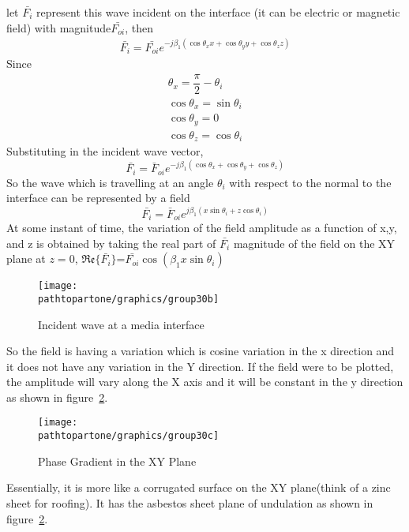 let $\bar{F_i}$ represent this wave incident on the interface (it can be electric or magnetic field) with magnitude$\bar{F_{oi}}$, then
\begin{align*}
\bar{F_{i}}=\bar{F_{oi}}e^{-j\beta_1(\cos\theta_xx +\cos\theta_yy+\cos\theta_zz)}
\end{align*}
\begin{equation}\end{equation}
Since
\begin{align*}
\theta_x=\dfrac{\pi}{2}-\theta_i\\
\cos\theta _x=\sin \theta_i\\
\cos \theta_y=0\\
\cos\theta_z=\cos \theta_i
\end{align*}
\begin{equation}\end{equation}
Substituting in the incident wave vector,
$$\bar{F_i}=\bar{F}_{oi}e^{-j\beta_1(\cos \theta_x+\cos \theta_y+\cos \theta_z)}$$
\begin{equation}\end{equation}
So the wave  which is travelling at an angle $\theta_i$ with respect to the normal to the interface can be represented by a field
$$\bar{F_i}=\bar{F}_{oi}e^{j\beta_1(x\sin \theta_i+z\cos \theta_i)} $$
\begin{equation}\end{equation}
At some instant of time, the variation of the field amplitude as a function of x,y, and z is obtained by taking the real part of $\bar{F_i}$ magnitude of the field on the XY plane at $z=0$, $\mathfrak{Re}\{\bar{F_i}\}$=$\bar{F_{oi}}\cos (\beta_1x\sin \theta_i)$
\begin{figure}[h]
\centering
\texttt{[image: \\pathtopartone/graphics/group30b]}
\caption{Incident wave at a media interface}
\label{fig:group30b}
\end{figure}

So the field is having a variation which is cosine variation in the x direction and it does not have any variation in the Y direction. If the field were to be plotted, the amplitude will vary along the X axis and it will be constant in the y direction as shown in figure~\ref{fig:group30c}.
\begin{figure}[h]
\centering
\texttt{[image: \\pathtopartone/graphics/group30c]}
\caption{Phase Gradient in the XY Plane}
\label{fig:group30c}
\end{figure}

Essentially, it is more like a corrugated surface on the XY plane(think of a zinc sheet for roofing). It has the asbestos sheet plane of undulation as shown in figure~\ref{fig:group30c}.

